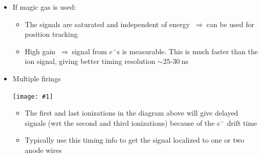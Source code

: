 \documentclass[11pt]{article}
\newcommand{\ns}{\text{ns}}
\newcommand{\el}{\ensuremath{e^{-}}\xspace}
\newcommand{\thus}{$~\Rightarrow~$}
\newcommand{\embedimgw}[2]{\begin{center}\texttt{[image: \#1]}\end{center}}
\begin{document}
\begin{itemize}
\begin{itemize}
  \end{itemize}
  \item If magic gas is used:
  \begin{itemize}
    \item The signals are saturated and independent of energy \thus can be used for position tracking
    \item High gain \thus signal from $\el$s is measurable. This is much faster than the ion signal, giving better timing resolution $\sim25\text{-}30~\ns$
  \end{itemize}
  \item Multiple firings 
  \embedimgw{figs/mwpc_multiple.png}{.8}
  \begin{itemize}
    \item The first and last ionizations in the diagram above will give delayed signals (wrt the second and third ionizations) because of the $\el$ drift time
    \item Typically use this timing info to get the signal localized to one or two anode wires
  \end{itemize}
\end{itemize}
\end{document}
